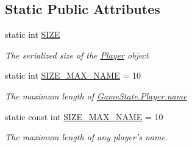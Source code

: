 \subsection*{Static Public Attributes}
\begin{DoxyCompactItemize}
\item 
static int \hyperlink{class_game_state_1_1_player_ada2d068d3d5f973f73abac805c162d17}{S\-I\-Z\-E}
\begin{DoxyCompactList}\small\item\em The serialized size of the \hyperlink{class_game_state_1_1_player}{Player} object \end{DoxyCompactList}\item 
static int \hyperlink{class_game_state_1_1_player_a1cdc9de8183b220e87632f7f6a7147d0}{S\-I\-Z\-E\-\_\-\-M\-A\-X\-\_\-\-N\-A\-M\-E} = 10
\begin{DoxyCompactList}\small\item\em The maximum length of \hyperlink{class_game_state_1_1_player_afc2b145df544ca5bffc7c87ef294bcde}{Game\-State.\-Player.\-name} \end{DoxyCompactList}\item 
\hypertarget{class_game_state_1_1_player_a16d0264ca6adfedb582e22f59a550fc5}{static const int \hyperlink{class_game_state_1_1_player_a16d0264ca6adfedb582e22f59a550fc5}{S\-I\-Z\-E\-\_\-\-M\-A\-X\-\_\-\-N\-A\-M\-E} = 10}\label{class_game_state_1_1_player_a16d0264ca6adfedb582e22f59a550fc5}

\begin{DoxyCompactList}\small\item\em The maximum length of any player's name. \end{DoxyCompactList}\end{DoxyCompactItemize}
